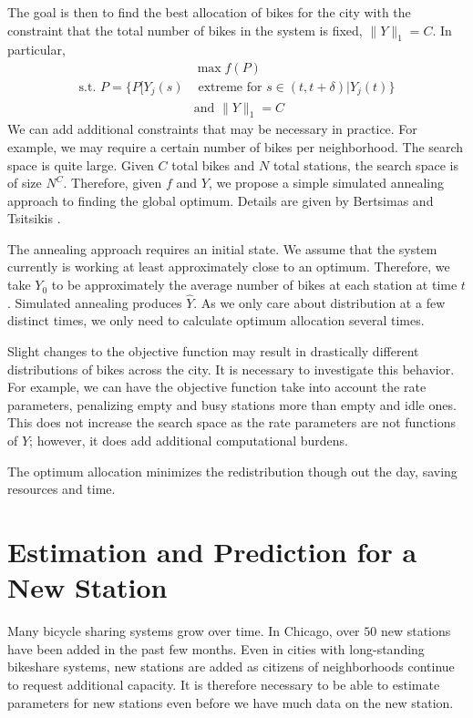 \documentclass{acm_proc_article-sp}
\begin{document}
The goal is then to find the best allocation of bikes for the city with the constraint that the total number of bikes in the system is fixed, $\| Y\|_1 = C$.  In particular,
\begin{align*}
&\max f (P) \\
\text{s.t. } P = \{ P[ Y_j(s) &\text{ extreme for } s \in (t,t+\delta) | Y_j (t) \} \\
&\text{and } \| Y \|_1 = C
\end{align*}
We can add additional constraints that may be necessary in practice.  For example, we may require a certain number of bikes per neighborhood.  The search space is quite large.  Given $C$ total bikes and $N$ total stations, the search space is of size $N^C$.  Therefore, given $f$ and $Y$, we propose a simple simulated annealing approach to finding the global optimum.  Details are given by Bertsimas and Tsitsikis \cite{bertsimas:simann}.

The annealing approach requires an initial state.  We assume that the system currently is working at least approximately close to an optimum.  Therefore, we take $Y_0$ to be approximately the average number of bikes at each station at time $t$.  Simulated annealing produces $\hat{Y}$.  As we only care about distribution at a few distinct times, we only need to calculate optimum allocation several times. 

Slight changes to the objective function may result in drastically different distributions of bikes across the city.  It is necessary to investigate this behavior.  For example, we can have the objective function take into account the rate parameters, penalizing empty and busy stations more than empty and idle ones.  This does not increase the search space as the rate parameters are not functions of $Y$; however, it does add additional computational burdens. 

The optimum allocation minimizes the redistribution though out the day, saving resources and time.


\section{Estimation and Prediction for a New Station} \label{newstation}

Many bicycle sharing systems grow over time.  In Chicago, over $50$ new stations have been added in the past few months.  Even in cities with long-standing bikeshare systems, new stations are added as citizens of neighborhoods continue to request additional capacity.  It is therefore necessary to be able to estimate parameters for new stations even before we have much data on the new station.
\end{document}
